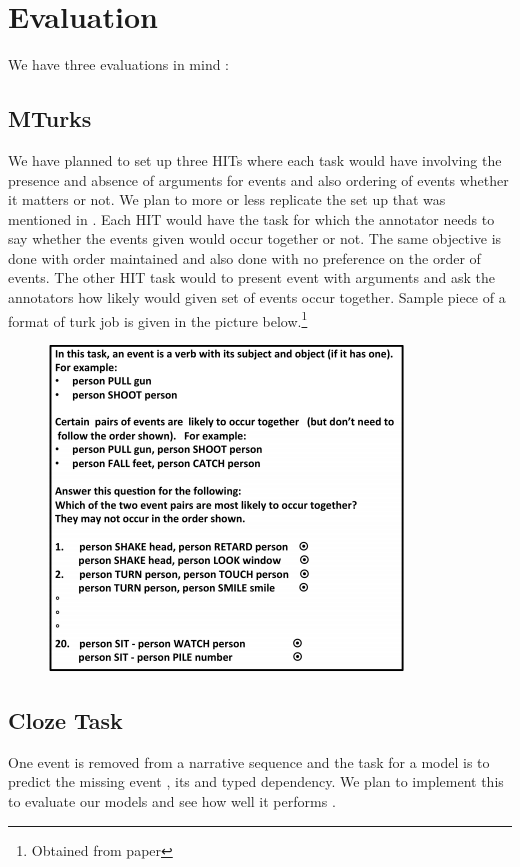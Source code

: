 \documentclass[11pt]{article}
\begin{document}
\section{Evaluation}
We have three evaluations in mind :
\subsection{MTurks}
We have planned to set up three HITs where each task would have involving the presence and absence of arguments for events and also ordering of events whether it matters or not.  We plan to more or less replicate the set up that was mentioned in \cite{film}. Each HIT would have the task for which the annotator needs to say whether the events given would occur together or not. The same objective is done with order maintained and also done with no preference on the order of events.  The other HIT task would to present event with arguments and ask the annotators how likely would given set of events occur together. Sample piece of a format of turk job is given in the picture below.\footnote{Obtained from \cite{film} paper  } \\

\begin{figure}[H]
\includegraphics[scale=0.65]{turk.png}
\end{figure}


\subsection{Cloze Task}
One event is removed from a narrative sequence and the task for a model is to predict the missing event , its and typed dependency.  We plan to implement this to evaluate our models and see how well it performs \cite{nec}.
\end{document}

